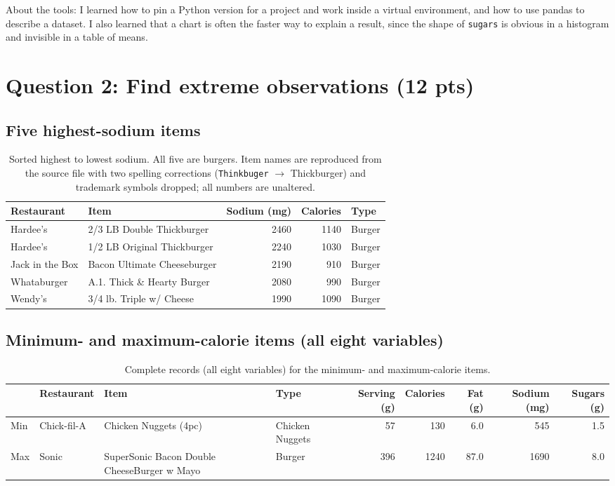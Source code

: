 \documentclass[11pt]{article}
\newcommand{\question}[2]{%
  \section*{\color{headblue}#1 \hfill \normalfont\small(#2)}}
\begin{document}
\noindent
About the tools: I learned how to pin a Python version for a project and work inside a
virtual environment, and how to use pandas to describe a dataset. I also learned that a
chart is often the faster way to explain a result, since the shape of \texttt{sugars}
is obvious in a histogram and invisible in a table of means.

\clearpage
\question{Question 2: Find extreme observations}{12 pts}

\subsection*{Five highest-sodium items}
\begin{table}[H]\centering\small
\begin{tabular}{llrrl}
\toprule
Restaurant & Item & Sodium (mg) & Calories & Type \\
\midrule
Hardee's        & 2/3 LB Double Thickburger      & 2460 & 1140 & Burger \\
Hardee's        & 1/2 LB Original Thickburger    & 2240 & 1030 & Burger \\
Jack in the Box & Bacon Ultimate Cheeseburger    & 2190 & 910  & Burger \\
Whataburger     & A.1. Thick \& Hearty Burger    & 2080 & 990  & Burger \\
Wendy's         & 3/4 lb. Triple w/ Cheese       & 1990 & 1090 & Burger \\
\bottomrule
\end{tabular}
\caption{Sorted highest to lowest sodium. All five are burgers. Item names are reproduced
from the source file with two spelling corrections (\texttt{Thinkbuger} $\rightarrow$
Thickburger) and trademark symbols dropped; all numbers are unaltered.}
\end{table}

\subsection*{Minimum- and maximum-calorie items (all eight variables)}
\begin{table}[H]\centering\footnotesize\setlength{\tabcolsep}{4pt}
\begin{tabular}{l l >{\raggedright\arraybackslash}p{3.4cm} l r r r r r}
\toprule
 & Restaurant & Item & Type & Serving (g) & Calories & Fat (g) & Sodium (mg) & Sugars (g) \\
\midrule
Min & Chick-fil-A & Chicken Nuggets (4pc) & Chicken Nuggets & 57 & 130 & 6.0 & 545 & 1.5 \\
Max & Sonic & SuperSonic Bacon Double CheeseBurger w Mayo & Burger & 396 & 1240 & 87.0 & 1690 & 8.0 \\
\bottomrule
\end{tabular}
\caption{Complete records (all eight variables) for the minimum- and maximum-calorie items.}
\end{table}
\end{document}
